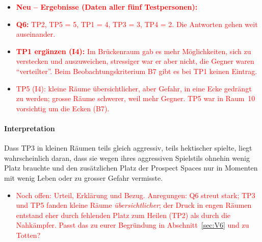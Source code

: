 \documentclass[../Main.tex]{subfiles}
\begin{document}
\begin{itemize}[leftmargin=1.5cm]
    \item \textcolor{red}{\textbf{Neu -- Ergebnisse (Daten aller fünf Testpersonen):}}
    \item \textcolor{red}{\textbf{Q6:} TP2, TP5 = 5, TP1 = 4, TP3 = 3, TP4 = 2. Die Antworten gehen weit auseinander.}
    \item \textcolor{red}{\textbf{TP1 ergänzen (I4):} Im Brückenraum gab es mehr Möglichkeiten, sich zu verstecken und auszuweichen, stressiger war er aber nicht, die Gegner waren \enquote{verteilter}. Beim Beobachtungskriterium B7 gibt es bei TP1 keinen Eintrag.}
    \item \textcolor{red}{TP5 (I4): kleine Räume übersichtlicher, aber Gefahr, in eine Ecke gedrängt zu werden; grosse Räume schwerer, weil mehr Gegner. TP5 war in Raum~10 vorsichtig um die Ecken (B7).}
\end{itemize}

\paragraph{Interpretation}
Dass TP3 in kleinen Räumen teils gleich aggressiv, teils hektischer spielte, liegt wahrscheinlich daran, dass sie wegen ihres aggressiven Spielstils ohnehin wenig Platz brauchte und den zusätzlichen Platz der Prospect Spaces nur in Momenten mit wenig Leben oder zu grosser Gefahr vermisste.

\begin{itemize}[leftmargin=1.5cm]
    \item \textcolor{red}{Noch offen: Urteil, Erklärung und Bezug. Anregungen: Q6 streut stark; TP3 und TP5 fanden kleine Räume \emph{übersichtlicher}; der Druck in engen Räumen entstand eher durch fehlenden Platz zum Heilen (TP2) als durch die Nahkämpfer. Passt das zu eurer Begründung in Abschnitt~\ref{sec:V6} und zu Totten?}
\end{itemize}
\end{document}
